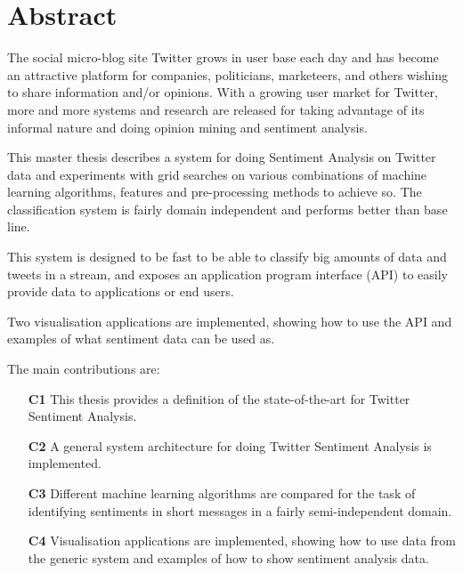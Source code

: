 \section*{Abstract}

The social micro-blog site Twitter grows in user base each day and has become an attractive platform for companies, politicians, marketeers, and others wishing to share information and/or opinions. With a growing user market for Twitter, more and more systems and research are released for taking advantage of its informal nature and doing opinion mining and sentiment analysis. 

This master thesis describes a system for doing Sentiment Analysis on Twitter data and experiments with grid searches on various combinations of machine learning algorithms, features and pre-processing methods to achieve so. The classification system is fairly domain independent and performs better than base line. 

This system is designed to be fast to be able to classify big amounts of data and tweets in a stream, and exposes an application program interface (API) to easily provide data to applications or end users. 

Two visualisation applications are implemented, showing how to use the API and examples of what sentiment data can be used as.

The main contributions are: 

\begin{itemize}
\item[\textbf{C1}] This thesis provides a definition of the state-of-the-art for Twitter Sentiment Analysis.

\item[\textbf{C2}] A general system architecture for doing Twitter Sentiment Analysis is implemented. 

\item[\textbf{C3}] Different machine learning algorithms are compared for the task of identifying sentiments in short messages in a fairly semi-independent domain.

\item[\textbf{C4}] Visualisation applications are implemented, showing how to use data from the generic system and examples of how to show sentiment analysis data.
\end{itemize}

\cleardoublepage